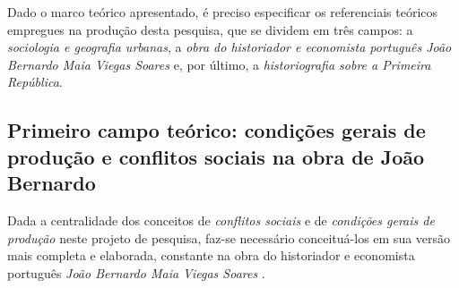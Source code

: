 
Dado o marco teórico apresentado, é preciso especificar os referenciais teóricos empregues na produção desta pesquisa, que se dividem em três campos: a \textit{sociologia e geografia urbanas}, a \textit{obra do historiador e economista português João Bernardo Maia Viegas Soares} e, por último, a \textit{historiografia sobre a Primeira República}.

\subsection[Primeiro campo teórico: condições gerais de produção e conflitos sociais na obra de João Bernardo]{Primeiro campo teórico: condições gerais de produção e conflitos sociais na obra de João Bernardo}
\label{subsec:cgpcsjobe}

Dada a centralidade dos conceitos de \textit{conflitos sociais} e de \textit{condições gerais de produção} neste projeto de pesquisa, faz-se necessário conceituá-los em sua versão mais completa e elaborada, constante na obra do historiador e economista português \textit{João Bernardo Maia Viegas Soares} \cite{BERNARDO1975, BERNARDO1977a, BERNARDO1977b, BERNARDO1977c, bernardo_inimigo_1979, BERNARDO1987, BERNARDO1991a, BERNARDO1991, BERNARDO1995, BERNARDO1997, BERNARDO1998, BERNARDO2002, bernardo_fascismo_2003, bernardo_capitalismo_2008, bernardo_fascismo_2015}. 

